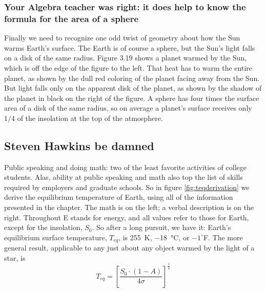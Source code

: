 \documentclass[amstex,12pt]{book}
\begin{document}
\subsubsection{Your Algebra teacher was right: it does help to know the formula for the area of a sphere}
Finally we need to recognize one odd twist of geometry about how the Sun warms Earth's surface. The Earth is of course a sphere, but the Sun’s light falls on a disk of the same radius. Figure 3.19 shows a planet warmed by the Sun, which is off the edge of the figure to the left. That heat has to warm the entire planet, as shown by the dull red coloring of the planet facing away from the Sun. But light falls only on the apparent disk of the planet, as shown by the shadow of the planet in black on the right of the figure. A sphere has four times the surface area of a disk of the same radius, so on average a planet’s surface receives only $1/4$ of the insolation at the top of the atmosphere. 
\subsection{Steven Hawkins be damned}
Public speaking and doing math: two of the least favorite activities of college students. Alas, ability at public speaking and math also top the list of skills required by employers and graduate schools. So in figure \ref{fig:teqderivation} we derive the equilibrium temperature of Earth, using all of the information presented in the chapter. The math is on the left; a verbal description is on the right. Throughout E stands for energy, and all values refer to those for Earth, except for the insolation, $S_0$. So after a long pursuit, we have it: Earth's equilibrium surface temperature, $T_{eq}$, is \SI{255}{K}, \SI{-18}{\celsius}, or $-1^{\circ}$F. The more general result, applicable to any just about any object warmed by the light of a star, is
\begin{equation}
	T_{eq}=\left[\frac{S_0 \cdot (1-A)}{4 \sigma}\right]^{\frac{1}{4}}  \label{eq:teq}
\end{equation}
\end{document}
